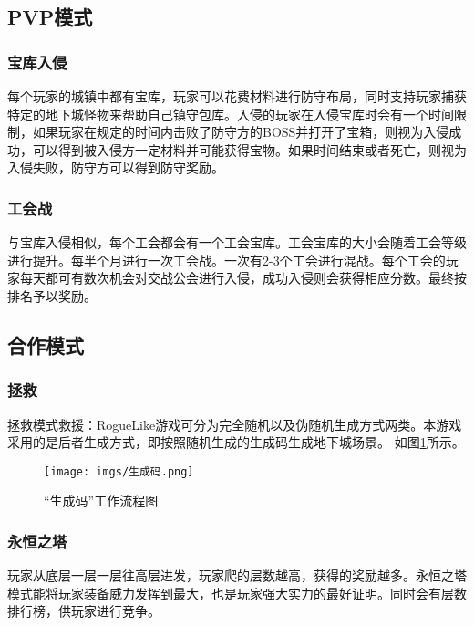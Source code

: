 \documentclass[UTF8,AutoFakeBold=1,AutoFakeSlant,zihao=-4]{cucthesis}
\begin{document}
\subsection{PVP模式}
\subsubsection{宝库入侵}
每个玩家的城镇中都有宝库，玩家可以花费材料进行防守布局，同时支持玩家捕获特定的地下城怪物来帮助自己镇守包库。入侵的玩家在入侵宝库时会有一个时间限制，如果玩家在规定的时间内击败了防守方的BOSS并打开了宝箱，则视为入侵成功，可以得到被入侵方一定材料并可能获得宝物。如果时间结束或者死亡，则视为入侵失败，防守方可以得到防守奖励。
\subsubsection{工会战}
与宝库入侵相似，每个工会都会有一个工会宝库。工会宝库的大小会随着工会等级进行提升。每半个月进行一次工会战。一次有2-3个工会进行混战。每个工会的玩家每天都可有数次机会对交战公会进行入侵，成功入侵则会获得相应分数。最终按排名予以奖励。


\subsection{合作模式}
\subsubsection{拯救}
拯救模式救援：RogueLike游戏可分为完全随机以及伪随机生成方式两类。本游戏采用的是后者生成方式，即按照随机生成的生成码生成地下城场景。
如图\ref{fig:code}所示。

\begin{figure}[ht]
    \centering
    \texttt{[image: imgs/生成码.png]}    
    \caption{“生成码”工作流程图}
    \label{fig:code}
\end{figure}

\subsubsection{永恒之塔}
玩家从底层一层一层往高层进发，玩家爬的层数越高，获得的奖励越多。永恒之塔模式能将玩家装备威力发挥到最大，也是玩家强大实力的最好证明。同时会有层数排行榜，供玩家进行竞争。
\end{document}
